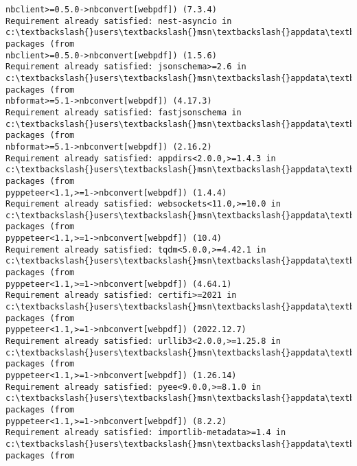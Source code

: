 \documentclass[11pt]{article}
\begin{document}
\begin{Verbatim}[commandchars=\\\{\}]
nbclient>=0.5.0->nbconvert[webpdf]) (7.3.4)
Requirement already satisfied: nest-asyncio in
c:\textbackslash{}users\textbackslash{}msn\textbackslash{}appdata\textbackslash{}local\textbackslash{}anaconda3\textbackslash{}lib\textbackslash{}site-packages (from
nbclient>=0.5.0->nbconvert[webpdf]) (1.5.6)
Requirement already satisfied: jsonschema>=2.6 in
c:\textbackslash{}users\textbackslash{}msn\textbackslash{}appdata\textbackslash{}local\textbackslash{}anaconda3\textbackslash{}lib\textbackslash{}site-packages (from
nbformat>=5.1->nbconvert[webpdf]) (4.17.3)
Requirement already satisfied: fastjsonschema in
c:\textbackslash{}users\textbackslash{}msn\textbackslash{}appdata\textbackslash{}local\textbackslash{}anaconda3\textbackslash{}lib\textbackslash{}site-packages (from
nbformat>=5.1->nbconvert[webpdf]) (2.16.2)
Requirement already satisfied: appdirs<2.0.0,>=1.4.3 in
c:\textbackslash{}users\textbackslash{}msn\textbackslash{}appdata\textbackslash{}local\textbackslash{}anaconda3\textbackslash{}lib\textbackslash{}site-packages (from
pyppeteer<1.1,>=1->nbconvert[webpdf]) (1.4.4)
Requirement already satisfied: websockets<11.0,>=10.0 in
c:\textbackslash{}users\textbackslash{}msn\textbackslash{}appdata\textbackslash{}local\textbackslash{}anaconda3\textbackslash{}lib\textbackslash{}site-packages (from
pyppeteer<1.1,>=1->nbconvert[webpdf]) (10.4)
Requirement already satisfied: tqdm<5.0.0,>=4.42.1 in
c:\textbackslash{}users\textbackslash{}msn\textbackslash{}appdata\textbackslash{}local\textbackslash{}anaconda3\textbackslash{}lib\textbackslash{}site-packages (from
pyppeteer<1.1,>=1->nbconvert[webpdf]) (4.64.1)
Requirement already satisfied: certifi>=2021 in
c:\textbackslash{}users\textbackslash{}msn\textbackslash{}appdata\textbackslash{}local\textbackslash{}anaconda3\textbackslash{}lib\textbackslash{}site-packages (from
pyppeteer<1.1,>=1->nbconvert[webpdf]) (2022.12.7)
Requirement already satisfied: urllib3<2.0.0,>=1.25.8 in
c:\textbackslash{}users\textbackslash{}msn\textbackslash{}appdata\textbackslash{}local\textbackslash{}anaconda3\textbackslash{}lib\textbackslash{}site-packages (from
pyppeteer<1.1,>=1->nbconvert[webpdf]) (1.26.14)
Requirement already satisfied: pyee<9.0.0,>=8.1.0 in
c:\textbackslash{}users\textbackslash{}msn\textbackslash{}appdata\textbackslash{}local\textbackslash{}anaconda3\textbackslash{}lib\textbackslash{}site-packages (from
pyppeteer<1.1,>=1->nbconvert[webpdf]) (8.2.2)
Requirement already satisfied: importlib-metadata>=1.4 in
c:\textbackslash{}users\textbackslash{}msn\textbackslash{}appdata\textbackslash{}local\textbackslash{}anaconda3\textbackslash{}lib\textbackslash{}site-packages (from

\end{Verbatim}
\end{document}
